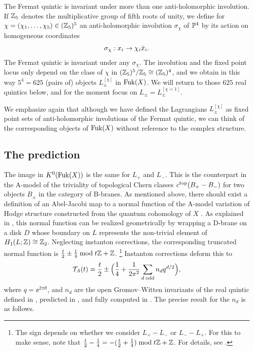 The Fermat quintic is invariant under more than one anti-holomorphic
involution. If ${\mathbb Z}_5$ denotes the multiplicative group of fifth roots
of unity, we define for $\chi=(\chi_1,\ldots,\chi_5)\in ({\mathbb Z}_5)^5$ an
anti-holomorphic involution $\sigma_\chi$ of ${\mathbb P}^4$ by its action 
on homogeneous coordinates
\begin{equation}
\eqlabel{actionon}
\sigma_\chi : x_i \to \chi_i \bar x_i .
\end{equation}
The Fermat quintic is invariant under any $\sigma_\chi$. The involution and
the fixed point locus only depend on the class of $\chi$ in 
$({\mathbb Z}_5)^5/{\mathbb Z}_5\cong ({\mathbb Z}_5)^4$, and we obtain in this way 
$5^4=625$ (pairs of) objects $L^{[\chi]}_\pm$ in ${\rm Fuk}(X)$. We will
return to those $625$ real quintics below, and for the moment focus
on $L_\pm = L^{[\chi=1]}_\pm$.

We emphasize again that although we have defined the Lagrangians 
$L_\pm^{[\chi]}$ as fixed point sets of anti-holomorphic involutions
of the Fermat quintic, we can think of the corresponding objects of 
${\rm Fuk}(X)$ without reference to the complex structure.

\subsection{The prediction}

The image in $K^0({\rm Fuk}(X))$ is the same for $L_+$ and $L_-$. This is
the counterpart in the A-model of the triviality of topological Chern 
classes $c^{\rm top}(B_+-B_-)$ for two objects $B_\pm$ in the category of
B-branes. As mentioned above, there should exist a definition of an 
Abel-Jacobi map to a normal function of the A-model variation of 
Hodge structure constructed from the quantum cohomology of $X$ 
\cite{compact,parkcity}. As explained in \cite{open},
this normal function can be realized geometrically by wrapping a D-brane 
on a disk $D$ whose boundary on $L$ represents the non-trivial element of 
$H_1(L;{\mathbb Z})\cong{\mathbb Z}_2$. Neglecting instanton corrections, the corresponding 
truncated normal function is $\frac t2 \pm \frac 14 \bmod t {\mathbb Z} + {\mathbb Z}$.%
\footnote{The sign depends on whether we consider $L_+-L_-$ or 
$L_--L_+$. For this to make sense, note that $\frac t2 - \frac 14=
-(\frac t2 +\frac 14) \bmod t{\mathbb Z}+{\mathbb Z}$. For details, see \cite{open}.} 
Instanton corrections deform this to
\begin{equation}
\eqlabel{deform}
\calt_A(t) = \frac{t}{2} \pm \Bigl( \frac 14 + \frac{1}{2 \pi^2} 
\sum_{d\;{\rm odd}} n_d q^{d/2} \Bigr) ,
\end{equation}
where $q=\ee^{2\pi\ii t}$, and $n_d$ are the open Gromov--Witten invariants
of the real quintic defined in \cite{solomon}, predicted in \cite{open},
and fully computed in \cite{psw}. The precise result for the $n_d$ is as 
follows.

